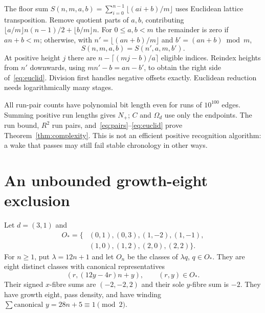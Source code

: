 \documentclass[11pt]{article}
\newcommand{\Od}{\Omega_d}
\begin{document}
The floor sum $S(n,m,a,b)=\sum_{i=0}^{n-1}\lfloor(ai+b)/m\rfloor$ uses Euclidean
lattice transposition. Remove quotient parts of $a,b$, contributing
$\lfloor a/m\rfloor n(n-1)/2+\lfloor b/m\rfloor n$.
For $0\le a,b<m$ the remainder is zero if $an+b<m$; otherwise, with
$n'=\lfloor(an+b)/m\rfloor$ and $b'=(an+b)\bmod m$,
\begin{equation}
 S(n,m,a,b)=S(n',a,m,b').\label{eq:euclid}
\end{equation}
At positive height $j$ there are $n-\lceil(mj-b)/a\rceil$ eligible indices.
Reindex heights from $n'$ downwards, using $mn'-b=an-b'$, to obtain the right
side of~\eqref{eq:euclid}. Division first handles negative offsets exactly.
Euclidean reduction needs logarithmically many stages.

All run-pair counts have polynomial bit length even for runs of $10^{100}$ edges.
Summing positive run lengths gives $N_+$; $C$ and $\Od$ use only the endpoints.
The run bound, $R^2$ run pairs, and~\eqref{eq:pairs}--\eqref{eq:euclid} prove
Theorem~\ref{thm:complexity}. This is not an efficient positive recognition
algorithm: a wake that passes may still fail stable chronology in other ways.

\section{An unbounded growth-eight exclusion}\label{sec:family}
Let $d=(3,1)$ and
\begin{align*}
 O_* =\{&(0,1),(0,3),(1,-2),(1,-1),\\[-2pt]
        &(1,0),(1,2),(2,0),(2,2)\}.
\end{align*}
For $n\ge1$, put $\lambda=12n+1$ and let $O_n$ be the classes of $\lambda q$,
$q\in O_*$. They are eight distinct classes with canonical representatives
\[
 (r,(12y-4r)n+y),\qquad (r,y)\in O_*.
\]
Their signed $x$-fibre sums are $(-2,-2,2)$ and their sole $y$-fibre sum is $-2$.
They have growth eight, pass density, and have winding
$\sum\text{canonical }y=28n+5\equiv1\pmod2$.
\end{document}
